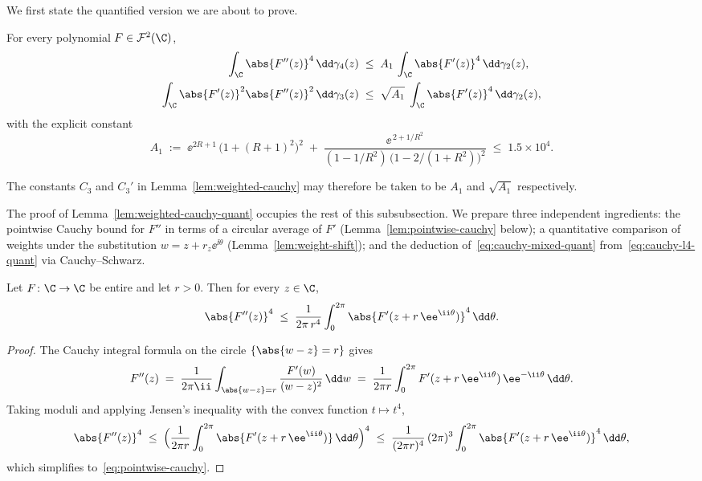 \medskip

We first state the quantified version we are about to prove.

\begin{lemma}\label{lem:weighted-cauchy-quant}
For every polynomial $F \in \mathcal{F}^2(\C)$,
\begin{align}
\int_{\C} \abs{F''(z)}^4\, \dd\gamma_4(z)
&\;\le\;
A_1\,\int_{\C} \abs{F'(z)}^4\, \dd\gamma_2(z),
\label{eq:cauchy-l4-quant}\\
\int_{\C} \abs{F'(z)}^2 \abs{F''(z)}^2\, \dd\gamma_3(z)
&\;\le\;
\sqrt{A_1}\;\int_{\C} \abs{F'(z)}^4\, \dd\gamma_2(z),
\label{eq:cauchy-mixed-quant}
\end{align}
with the explicit constant
\begin{equation}\label{eq:A1-explicit}
A_1
\;:=\;
\ee^{2R+1}\,\bigl(1+(R+1)^2\bigr)^{2}
\;+\;
\frac{\ee^{\,2+1/R^{2}}}{(1-1/R^{2})\,\bigl(1-2/(1+R^{2})\bigr)^{2}}
\;\le\; 1.5\times 10^{4}.
\end{equation}
\end{lemma}

\noindent
The constants $C_3$ and $C_3'$ in
Lemma~\ref{lem:weighted-cauchy} may therefore be taken to be
$A_1$ and $\sqrt{A_1}$ respectively.

\medskip

The proof of Lemma~\ref{lem:weighted-cauchy-quant} occupies the rest of
this subsubsection.  We prepare three independent ingredients:
the pointwise Cauchy bound for $F''$ in terms of a circular average of
$F'$ (Lemma~\ref{lem:pointwise-cauchy} below); a quantitative comparison
of weights under the substitution $w = z + r_z\ee^{\ii\theta}$
(Lemma~\ref{lem:weight-shift}); and the deduction
of~\eqref{eq:cauchy-mixed-quant} from~\eqref{eq:cauchy-l4-quant} via
Cauchy--Schwarz.

\begin{lemma}\label{lem:pointwise-cauchy}
Let $F \colon \C \to \C$ be entire and let $r > 0$.  Then for every
$z \in \C$,
\begin{equation}\label{eq:pointwise-cauchy}
\abs{F''(z)}^{4}
\;\le\;
\frac{1}{2\pi\, r^{4}} \int_{0}^{2\pi}
\abs{F'(z + r\,\ee^{\ii\theta})}^{4}\, \dd\theta.
\end{equation}
\end{lemma}

\begin{proof}
The Cauchy integral formula on the circle $\{\abs{w-z} = r\}$ gives
\[
F''(z)
\;=\;
\frac{1}{2\pi\ii}\int_{\abs{w-z}=r} \frac{F'(w)}{(w-z)^{2}}\,\dd w
\;=\;
\frac{1}{2\pi r}\int_{0}^{2\pi} F'(z + r\,\ee^{\ii\theta})\,
\ee^{-\ii\theta}\,\dd\theta.
\]
Taking moduli and applying Jensen's inequality with the convex function
$t \mapsto t^{4}$,
\[
\abs{F''(z)}^{4}
\;\le\;
\Bigl(\frac{1}{2\pi r}\int_{0}^{2\pi}
\abs{F'(z + r\,\ee^{\ii\theta})}\,\dd\theta\Bigr)^{4}
\;\le\;
\frac{1}{(2\pi r)^{4}}\,(2\pi)^{3}
\int_{0}^{2\pi}\abs{F'(z + r\,\ee^{\ii\theta})}^{4}\,\dd\theta,
\]
which simplifies to~\eqref{eq:pointwise-cauchy}.
\end{proof}

